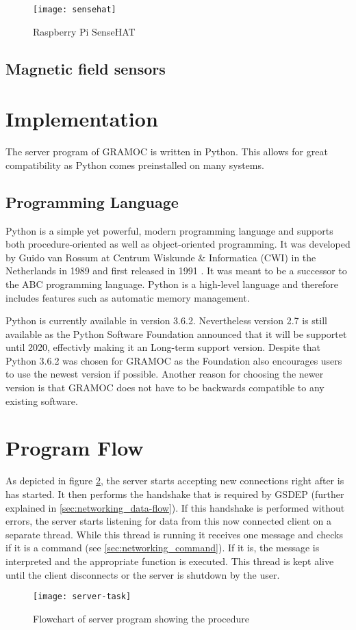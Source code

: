 \begin{figure}[H]
	\centering
	\texttt{[image: sensehat]}
	\caption{Raspberry Pi SenseHAT}
	\label{fig:raspberrypi3b}
\end{figure}

\subsection{Magnetic field sensors}


\section{Implementation}

The server program of GRAMOC is written in Python. This allows for great compatibility as Python comes preinstalled on many systems.

\subsection{Programming Language}

Python is a simple yet powerful, modern programming language and supports both procedure-oriented as well as object-oriented programming. It was developed by Guido van Rossum at Centrum Wiskunde \& Informatica (CWI) in the Netherlands in 1989 and first released in 1991 \cite{HistoryOfPython}. It was meant to be a successor to the ABC programming language. Python is a high-level language and therefore includes features such as automatic memory management.

Python is currently available in version 3.6.2. Nevertheless version 2.7 is still available as the Python Software Foundation announced that it will be supportet until 2020, effectivly making it an Long-term support version. Despite that Python 3.6.2 was chosen for GRAMOC as the Foundation also encourages users to use the newest version if possible. Another reason for choosing the newer version is that GRAMOC does not have to be backwards compatible to any existing software.

\section{Program Flow}

As depicted in figure \ref{fig:server-program-flow}, the server starts accepting new connections right after is has started. It then performs the handshake that is required by GSDEP (further explained in \ref{sec:networking_data-flow}). If this handshake is performed without errors, the server starts listening for data from this now connected client on a separate thread. While this thread is running it receives one message and checks if it is a command (see \ref{sec:networking_command}). If it is, the message is interpreted and the appropriate function is executed. This thread is kept alive until the client disconnects or the server is shutdown by the user.

\begin{figure}[H]
	\centering
	\texttt{[image: server-task]}
	\caption{Flowchart of server program showing the procedure}
	\label{fig:server-program-flow}
\end{figure}
